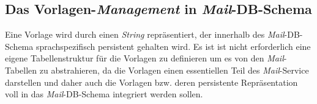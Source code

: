 \subsection{Das Vorlagen-\emph{Management} in \emph{Mail}-DB-Schema}
Eine Vorlage wird durch einen \emph{String} repräsentiert, der innerhalb des \emph{Mail}-DB-Schema sprachspezifisch  persistent gehalten wird. Es ist ist nicht erforderlich eine eigene Tabellenstruktur für die Vorlagen zu definieren um es von den \emph{Mail}-Tabellen zu abstrahieren, da die Vorlagen einen essentiellen Teil des \emph{Mail}-Service darstellen und daher auch die Vorlagen bzw. deren persistente Repräsentation voll in das \emph{Mail}-DB-Schema  integriert werden sollen.